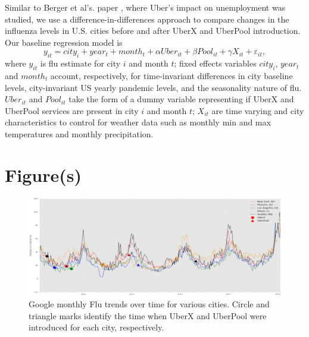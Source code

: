 \documentclass[a4paper,12pt]{article}
\begin{document}
Similar to Berger et al's. paper \cite{berger2017drivers}, where Uber's impact on unemployment was studied, we use a difference-in-differences approach to compare changes in the influenza levels in U.S. cities before and after UberX and UberPool introduction. Our baseline regression model is
\[
y_{it}=city_{i}+year_{t}+month_{t}+\alpha Uber_{it}+\beta Pool_{it}+\gamma X_{it}+ \varepsilon_{it},
\]
where $y_{it}$ is flu estimate for city $i$ and month $t$; fixed effects variables $city_{i}$, $year_{t}$ and $month_{t}$ account, respectively, for time-invariant differences in city baseline levels, city-invariant US yearly pandemic levels, and the seasonality nature of flu. $Uber_{it}$ and $ Pool_{it}$ take the form of a dummy variable representing if UberX and UberPool services are present in city $i$ and month $t$; $X_{it}$ are time varying and city characteristics to control for weather data such as monthly min and max temperatures and monthly precipitation.










\section{Figure(s)}

\begin{figure}[htp]
\centering
\includegraphics[width=13cm]{images/fig1}
\vspace{-0.5em}
\caption{Google monthly Flu trends over time for various cities. Circle and triangle marks identify the time when UberX and UberPool were introduced for each city, respectively.}
\label{fig:Uber}
\end{figure}
\end{document}
